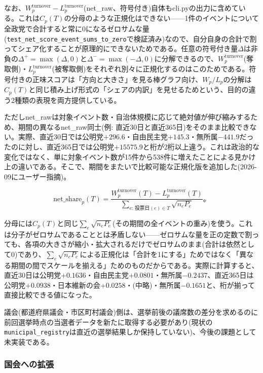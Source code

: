 \documentclass[a4paper,11pt]{ltjsarticle}
\begin{document}
なお、$W_p^{\text{turnover}}-L_p^{\text{turnover}}$(net\_raw、符号付き)自体もcli.pyの出力に含めている。これは$C_p(T)$の分母のような正規化はできない——1件のイベントについて全政党で合計すると常に0になるゼロサムな量(\texttt{test\_net\_score\_event\_sums\_to\_zero}で検証済み)なので、自分自身の合計で割ってシェア化することが原理的にできないためである。任意の符号付き量$\Delta$は非負の$\Delta^+=\max(\Delta,0)$と$\Delta^-=\max(-\Delta,0)$に分解できるので、$W_p^{\text{turnover}}$(奪取側)・$L_p^{\text{turnover}}$(被奪取側)をそれぞれ別々に正規化するのはこのためである。符号付きの正味スコアは「方向と大きさ」を見る棒グラフ向け、$W_p/L_p$の分解は$C_p(T)$と同じ積み上げ形式の「シェアの内訳」を見せるためという、目的の違う2種類の表現を両方提供している。

ただしnet\_rawは対象イベント数・自治体規模に応じて絶対値が伸び縮みするため、期間の異なるnet\_raw同士(例: 直近30日と直近365日)をそのまま比較できない。実際、直近30日では公明党$+296.6$・自由民主党$+145.3$・無所属$-441.9$だったのに対し、直近365日では公明党$+15575.9$と桁が2桁以上違う。これは政治的な変化ではなく、単に対象イベント数が15件から538件に増えたことによる見かけ上の違いである。そこで、期間をまたいで比較可能な正規化版を追加した(2026-09にユーザー指摘)。

\[
\text{net\_share}_p(T) = \frac{W_p^{\text{turnover}}(T) - L_p^{\text{turnover}}(T)}{\displaystyle\sum_{e:\,投票日(e)\in T} \sqrt{n_eP_e}}。
\]

分母には$C_p(T)$と同じ$\sum_e\sqrt{n_eP_e}$(その期間の全イベントの重み)を使う。これは分子がゼロサムであることとは矛盾しない——ゼロサムな量を正の定数で割っても、各項の大きさが縮小・拡大されるだけでゼロサムのまま(合計は依然として0)であり、$\sum_e\sqrt{n_eP_e}$による正規化は「合計を1にする」ためではなく「異なる期間の間でスケールを揃える」ためのものだからである。実際に計算すると、直近30日は公明党$+0.1636$・自由民主党$+0.0801$・無所属$-0.2437$、直近365日は公明党$+0.0938$・日本維新の会$+0.0258$・(中略)・無所属$-0.1651$と、桁が揃って直接比較できる値になった。

議会(都道府県議会・市区町村議会)側は、選挙前後の議席数の差分を求めるのに前回選挙時点の当選者データを新たに取得する必要があり(現状の\texttt{municipal\_registry}は直近の選挙結果しか保持していない)、今後の課題として未実装である。

\subsubsection{国会への拡張}
\label{sec:diet-turnover-extension}
\end{document}
